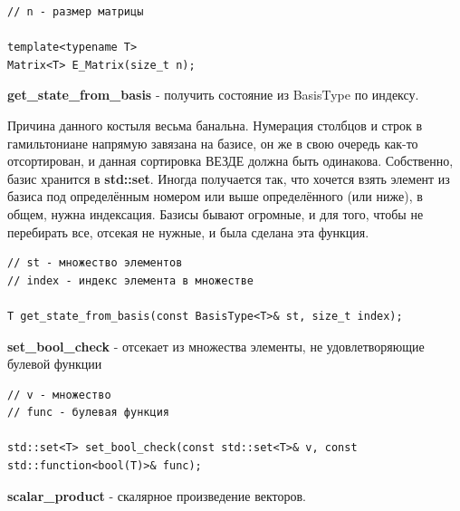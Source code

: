 \documentclass[12pt,fleqn]{article}
\begin{document}
\begin{mdframed}[linecolor=black, topline=true, bottomline=true,
    leftline=false, rightline=false]
\begin{verbatim}
// n - размер матрицы

template<typename T>
Matrix<T> E_Matrix(size_t n);
    \end{verbatim}
\end{mdframed}

\begin{center}{\textbf{get\_state\_from\_basis} - получить состояние из BasisType по индексу.}\end{center}

        Причина данного костыля весьма банальна. Нумерация столбцов и строк в гамильтониане напрямую завязана на базисе, он же в свою очередь как-то отсортирован, 
        и данная сортировка ВЕЗДЕ должна быть одинакова. Собственно, базис хранится в \textbf{std::set}. Иногда получается так, что хочется взять элемент из базиса под определённым номером или выше 
        определённого (или ниже), в общем, нужна индексация. Базисы бывают огромные, и для того, чтобы не перебирать все, отсекая не нужные, и была сделана эта функция.

\begin{mdframed}[linecolor=black, topline=true, bottomline=true,
    leftline=false, rightline=false]
\begin{verbatim}
// st - множество элементов
// index - индекс элемента в множестве

T get_state_from_basis(const BasisType<T>& st, size_t index);
    \end{verbatim}
\end{mdframed}    

\begin{center}{\textbf{set\_bool\_check} - отсекает из множества элементы, не удовлетворяющие булевой функции}\end{center}
\begin{mdframed}[linecolor=black, topline=true, bottomline=true,
    leftline=false, rightline=false]
\begin{verbatim}
// v - множество
// func - булевая функция

std::set<T> set_bool_check(const std::set<T>& v, const std::function<bool(T)>& func);
\end{verbatim}
\end{mdframed}  

\begin{center}{\textbf{scalar\_product} - скалярное произведение векторов.}\end{center}
\end{document}

